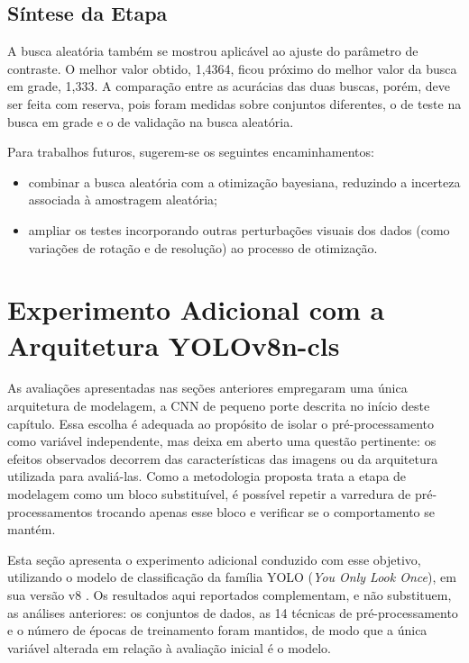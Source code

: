 \subsection{Síntese da Etapa}

A busca aleatória também se mostrou aplicável ao ajuste do parâmetro de contraste. O melhor valor obtido, 1,4364, ficou próximo do melhor valor da busca em grade, 1,333. A comparação entre as acurácias das duas buscas, porém, deve ser feita com reserva, pois foram medidas sobre conjuntos diferentes, o de teste na busca em grade e o de validação na busca aleatória.

Para trabalhos futuros, sugerem-se os seguintes encaminhamentos:
\begin{itemize}
    \item combinar a busca aleatória com a otimização bayesiana, reduzindo a incerteza associada à amostragem aleatória;
    \item ampliar os testes incorporando outras perturbações visuais dos dados (como variações de rotação e de resolução) ao processo de otimização.
\end{itemize}


\section{Experimento Adicional com a Arquitetura YOLOv8n-cls}
\label{sec:experimentos_yolo}

As avaliações apresentadas nas seções anteriores empregaram uma única arquitetura de modelagem, a CNN de pequeno porte descrita no início deste capítulo. Essa escolha é adequada ao propósito de isolar o pré-processamento como variável independente, mas deixa em aberto uma questão pertinente: os efeitos observados decorrem das características das imagens ou da arquitetura utilizada para avaliá-las. Como a metodologia proposta trata a etapa de modelagem como um bloco substituível, é possível repetir a varredura de pré-processamentos trocando apenas esse bloco e verificar se o comportamento se mantém.

Esta seção apresenta o experimento adicional conduzido com esse objetivo, utilizando o modelo de classificação da família YOLO (\textit{You Only Look Once}), em sua versão v8 \cite{jocher2023yolov8}. Os resultados aqui reportados complementam, e não substituem, as análises anteriores: os conjuntos de dados, as 14 técnicas de pré-processamento e o número de épocas de treinamento foram mantidos, de modo que a única variável alterada em relação à avaliação inicial é o modelo.

